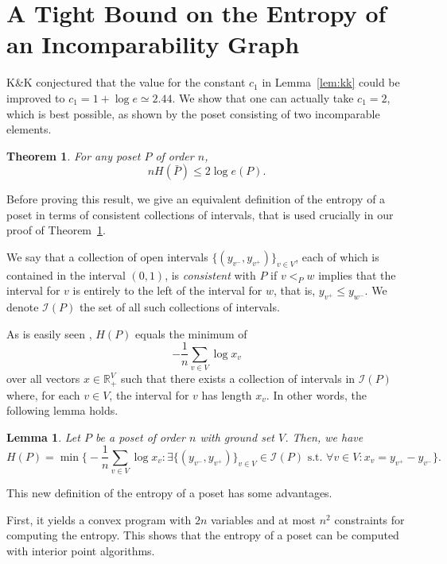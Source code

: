 \documentclass{article} \usepackage{fullpage}
\newtheorem{lemma}{Lemma}
\newtheorem{theorem}{Theorem}
\begin{document}
\section{A Tight Bound on the Entropy of an Incomparability Graph}
\label{sec:tight_bound}

K\&K conjectured that the value for the constant $c_1$ in Lemma~\ref{lem:kk} could be improved to $c_{1} = 1 + \log e \simeq 2.44$. We show that one can actually take $c_{1}=2$, which is best possible, as shown by the poset consisting of two incomparable elements.

\begin{theorem}
\label{th:c1}
For any poset $P$ of order $n$,
$$
n H(\bar{P}) \leq 2 \log e(P).
$$
\end{theorem}

Before proving this result, we give an equivalent definition of the entropy of a poset in terms of consistent collections of intervals, that is used crucially in our proof of Theorem~\ref{th:c1}.

We say that a collection of open intervals $\{(y_{v^-},y_{v^+})\}_{v \in V}$, each of which is contained in the interval $(0,1)$, is {\sl consistent\/} with $P$ if $v <_P w$ implies that the interval for $v$ is entirely to the left of the interval for $w$, that is, $y_{v^+} \leq y_{w^-}$. We denote $\mathcal{I}(P)$ the set of all such collections of intervals.

As is easily seen \cite{POP_SICOMP}, $H(P)$ equals the minimum of 
$$- \frac{1}{n} \sum_{v \in V} \log x_v$$
over all vectors $x \in \mathbb{R}_+^V$ such that there exists a collection of intervals in $\mathcal{I}(P)$ where, for each $v \in V$, the interval for $v$ has length $x_v$. In other words, the following lemma holds.

\begin{lemma}
\label{lem:intH}
Let $P$ be a poset of order $n$ with ground set $V$. Then, we have
$$
H(P) = \min \Big\{ - \frac{1}{n} \sum_{v \in V} \log x_v : \exists \{(y_{v^-},y_{v^+})\}_{v \in V} \in \mathcal{I}(P) \textrm{ s.t. } \forall v \in V : x_v = y_{v^+} - y_{v^-}\Big\}.
$$
\end{lemma}

This new definition of the entropy of a poset has some advantages.

First, it yields a convex program with $2n$ variables and at most $n^2$ constraints for computing the entropy. This shows that the entropy of a poset can be computed with interior point algorithms.
\end{document}
